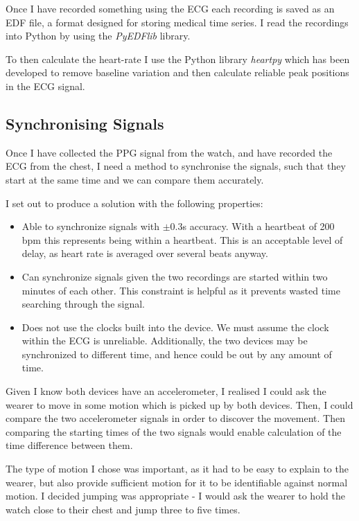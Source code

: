 \documentclass[12pt,a4paper,twoside,openany]{report}
\begin{document}
Once I have recorded something using the ECG 
each recording is saved as an EDF file, a format
designed for storing medical time series. I read the recordings into Python
by using the \emph{PyEDFlib} library.

To then calculate the heart-rate I use the Python library \emph{heartpy} which
has been developed to remove baseline variation and then calculate reliable
peak positions in the ECG signal.

\subsection{Synchronising Signals} \label{sec:sync}

Once I have collected the PPG signal from the watch, and have recorded the ECG
from the chest, I need a method to synchronise the signals, such that they
start at the same time and we can compare them accurately.

I set out to produce a solution with the following properties:
\begin{itemize}
	\item Able to synchronize signals with \(\pm0.3\)s accuracy. With a
		heartbeat of 200 bpm this represents being within a heartbeat.
		This is an acceptable level of delay, as heart rate is
		averaged over several beats anyway.

	\item Can synchronize signals given the two recordings are started
		within two minutes of each other. This constraint is helpful
		as it prevents wasted time searching through the signal.

	\item Does not use the clocks built into the device. We must assume
		the clock within the ECG is unreliable. Additionally, the two
		devices may be synchronized to different time, and hence could
		be out by any amount of time.
\end{itemize}

Given I know both devices have an accelerometer, I realised I could ask the
wearer to move in some motion which is picked up by both devices. Then, I
could compare the two accelerometer signals in order to discover the
movement. Then comparing the starting times of the two signals would enable
calculation of the time difference between them.

The type of motion I chose was important, as it had to be easy to explain to
the wearer, but also provide sufficient motion for it to be identifiable
against normal motion. I decided jumping was appropriate -
I would ask the wearer to hold the watch close to their chest and jump three
to five times.
\end{document}
